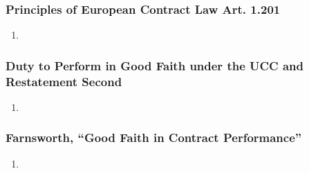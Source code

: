 \subsubsection{Principles of European Contract Law Art. 1.201}

\begin{enumerate}
    \item %
\end{enumerate}

\subsubsection{Duty to Perform in Good Faith under the UCC and Restatement 
Second}

\begin{enumerate}
    \item %
\end{enumerate}

\subsubsection{Farnsworth, ``Good Faith in Contract Performance''}

\begin{enumerate}
    \item %
\end{enumerate}

